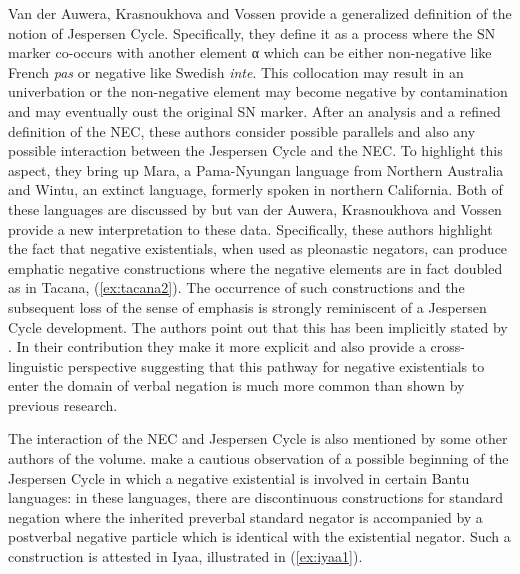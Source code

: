 \documentclass[output=paper,chinesefont,colorlinks,citecolor=brown]{langscibook}
\begin{document}
Van der Auwera, Krasnoukhova and Vossen provide a generalized definition of the notion of Jespersen Cycle. Specifically, they define it as a process where the SN marker co-occurs with another element α which can be either non-negative like French \textit{pas} or negative like Swedish \textit{inte}. This collocation may result in an univerbation or the non-negative element may become negative by contamination and may eventually oust the original SN marker. After an analysis and a refined definition of the NEC, these authors consider possible parallels and also any possible interaction between the Jespersen Cycle and the NEC. To highlight this aspect, they bring up Mara, a Pama-Nyungan language from Northern Australia and Wintu, an extinct language, formerly spoken in northern California. Both of these languages are discussed by \citet[10, 14]{Croft1991} but van der Auwera, Krasnoukhova and Vossen provide a new interpretation to these data. Specifically, these authors highlight the fact that negative existentials, when used as pleonastic negators, can produce emphatic negative constructions where the negative elements are in fact doubled as in Tacana, (\ref{ex:tacana2}). The occurrence of such constructions and the subsequent loss of the sense of emphasis is strongly reminiscent of a Jespersen Cycle development. The authors point out that this has been implicitly stated by \citet[14]{Croft1991}. In their contribution they make it more explicit and also provide a cross-linguistic perspective suggesting that this pathway for negative existentials to enter the domain of verbal negation is much more common than shown by previous research.


The interaction of the NEC and Jespersen Cycle is also mentioned by some other authors of the volume.  make a cautious observation of a possible beginning of the Jespersen Cycle in which a negative existential is involved in certain Bantu languages: in these languages, there are discontinuous constructions for standard negation where the inherited preverbal standard negator is accompanied by a postverbal negative particle which is identical with the existential negator. Such a construction is attested in Iyaa, illustrated in (\ref{ex:iyaa1}).
\end{document}

